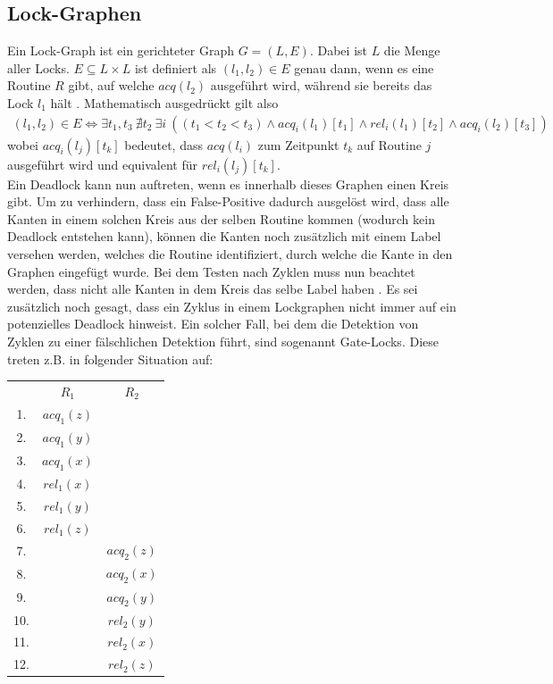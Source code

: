 \subsection{Lock-Graphen}
Ein Lock-Graph ist ein gerichteter Graph $G = (L, E)$. Dabei ist $L$ die Menge 
aller Locks. $E \subseteq L \times L$ ist definiert als $(l_1, l_2) \in E$ genau 
dann, wenn es eine Routine $R$ gibt, auf welche $acq(l_2)$ ausgeführt wird, während sie 
bereits das Lock $l_1$ hält \cite{bensalem}. Mathematisch ausgedrückt gilt also 
\begin{align*}
    (l_1, l_2) \in E \Leftrightarrow \exists t_1, t_3\ \nexists t_2\ \exists i\ ((t_1 < t_2 < t_3) \land acq_i(l_1)[t_1] \land rel_i(l_1)[t_2] \land  acq_i(l_2)[t_3])
\end{align*}
wobei $acq_i(l_j)[t_k]$ bedeutet, dass $acq(l_i)$ zum Zeitpunkt $t_k$ auf Routine 
$j$ ausgeführt wird und equivalent für $rel_i(l_j)[t_k]$.\\
Ein Deadlock kann nun auftreten, wenn es innerhalb dieses Graphen einen Kreis 
gibt. Um zu verhindern, dass ein False-Positive dadurch ausgelöst wird, dass 
alle Kanten in einem solchen Kreis aus der selben Routine kommen (wodurch kein 
Deadlock entstehen kann), können die Kanten noch zusätzlich mit einem Label 
versehen werden, welches die Routine identifiziert, durch welche die Kante in 
den Graphen eingefügt wurde. Bei dem Testen nach Zyklen muss nun beachtet 
werden, dass nicht alle Kanten in dem Kreis das selbe Label haben 
\cite{bensalem}. Es sei zusätzlich noch gesagt, dass ein Zyklus in einem 
Lockgraphen nicht immer auf ein potenzielles Deadlock hinweist. Ein solcher 
Fall, bei dem die Detektion von Zyklen zu einer fälschlichen Detektion 
führt, sind sogenannt Gate-Locks. Diese treten z.B. in folgender Situation
auf:
\begin{table}[H]
     \centering
     \begin{tabular}{ccc}
        & $R_1$        & $R_2$          \\
     1. & $acq_{1}(z)$ &                \\
     2. & $acq_{1}(y)$ &                \\
     3. & $acq_{1}(x)$ &                \\
     4. & $rel_{1}(x)$ &                \\
     5. & $rel_{1}(y)$ &                \\
     6. & $rel_{1}(z)$ &                \\
     7. &              & $acq_{2}(z)$ \\
     8. &              & $acq_{2}(x)$ \\
     9. &              & $acq_{2}(y)$ \\
    10. &              & $rel_{2}(y)$ \\
    11. &              & $rel_{2}(x)$ \\
    12. &              & $rel_{2}(z)$
    \end{tabular}
\end{table}
